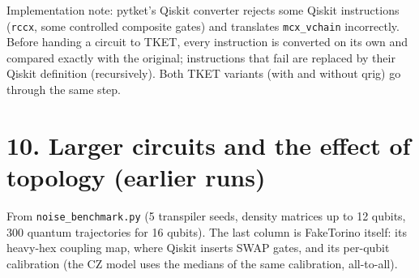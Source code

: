 \documentclass[
  10pt,
]{article}
\begin{document}
Implementation note: pytket's Qiskit converter rejects some Qiskit
instructions (\texttt{rccx}, some controlled composite gates) and
translates \texttt{mcx\_vchain} incorrectly. Before handing a circuit to
TKET, every instruction is converted on its own and compared exactly
with the original; instructions that fail are replaced by their Qiskit
definition (recursively). Both TKET variants (with and without qrig) go
through the same step.

\section{10. Larger circuits and the effect of topology (earlier
runs)}\label{larger-circuits-and-the-effect-of-topology-earlier-runs}

From \texttt{noise\_benchmark.py} (5 transpiler seeds, density matrices
up to 12 qubits, 300 quantum trajectories for 16 qubits). The last
column is FakeTorino itself: its heavy-hex coupling map, where Qiskit
inserts SWAP gates, and its per-qubit calibration (the CZ model uses the
medians of the same calibration, all-to-all).
\end{document}
